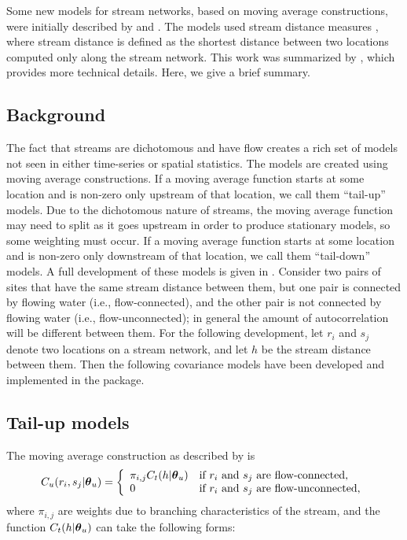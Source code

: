 \documentclass[nojss]{jss}
\def\btheta{\mbox{\boldmath $\theta$}}
\begin{document}
Some new models for stream networks, based on moving average
constructions, were initially described by
\citet{Ver:Pete:Theo:spat:2006} and
\citet{Cres:Frey:Harc:Smit:spat:2006}. The models used stream
distance measures \citep*[e.g.,][]{Dent:Grim:spat:1999}, where stream
distance is defined as the shortest distance between two locations
computed only along the stream network. This work was summarized by
\citet{Ver:Pete:Move:2010}, which provides more technical
details. Here, we give a brief summary.


\subsection{Background}

The fact that streams are dichotomous and have flow creates a rich set
of models not seen in either time-series or spatial statistics.  The
models are created using moving average constructions.  If a moving
average function starts at some location and is non-zero only upstream
of that location, we call them ``tail-up'' models. Due to the
dichotomous nature of streams, the moving average function may need to
split as it goes upstream in order to produce stationary models, so
some weighting must occur. If a moving average function starts at some
location and is non-zero only downstream of that location, we call
them ``tail-down'' models. A full development of these models is given
in \citet{Ver:Pete:Move:2010}. Consider two pairs of sites that have
the same stream distance between them, but one pair is connected by
flowing water (i.e., flow-connected), and the other pair is not
connected by flowing water (i.e., flow-unconnected); in general the
amount of autocorrelation will be different between them. For the
following development, let $r_i$ and $s_j$ denote two locations on a
stream network, and let $h$ be the stream distance between them.  Then
the following covariance models have been developed and implemented in
the  package.


\subsection{Tail-up models}\label{tailup}

The moving average construction as described by \citet{Ver:Pete:Theo:spat:2006} is
%
%
\begin{equation} \label{eq:moveaveup} C_u(r_i,s_j|\btheta_u)=
  \left\{ \begin{array}{ll} \pi_{i,j}C_t(h|\btheta_u) &
      \textrm{if $r_i$ and $s_j$ are flow-connected,} \\
      0 & \textrm{if $r_i$ and $s_j$ are flow-unconnected,}
	\end{array} \right.
\end{equation}
%
where $\pi_{i,j}$ are weights due to branching characteristics of the
stream, and the function $C_t(h|\btheta_u)$ can take the following
forms:
\end{document}
